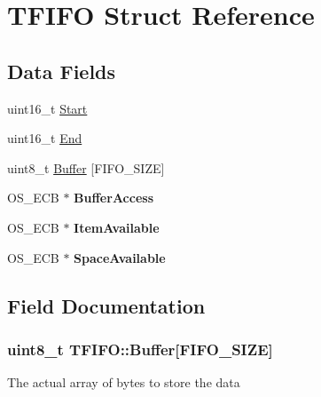 \hypertarget{struct_t_f_i_f_o}{}\section{T\+F\+I\+F\+O Struct Reference}
\label{struct_t_f_i_f_o}
\subsection*{Data Fields}
\begin{DoxyCompactItemize}
\item 
uint16\+\_\+t \hyperlink{struct_t_f_i_f_o_a092a7559431a12616672354641908167}{Start}
\item 
uint16\+\_\+t \hyperlink{struct_t_f_i_f_o_a5063b875898a6f23a97aa3ca17f0544b}{End}
\item 
uint8\+\_\+t \hyperlink{struct_t_f_i_f_o_a5a9d712880dc4f1d5571b96452cd85f8}{Buffer} \mbox{[}F\+I\+F\+O\+\_\+\+S\+I\+Z\+E\mbox{]}
\item 
\hypertarget{struct_t_f_i_f_o_af813d56b46ccae2525c93ef4e3246225}{}O\+S\+\_\+\+E\+C\+B $\ast$ {\bfseries Buffer\+Access}\label{struct_t_f_i_f_o_af813d56b46ccae2525c93ef4e3246225}

\item 
\hypertarget{struct_t_f_i_f_o_a84541650159125cfad1f042cf946cc19}{}O\+S\+\_\+\+E\+C\+B $\ast$ {\bfseries Item\+Available}\label{struct_t_f_i_f_o_a84541650159125cfad1f042cf946cc19}

\item 
\hypertarget{struct_t_f_i_f_o_ad4f8a6e9d0526a76d2b9b6ed319fada9}{}O\+S\+\_\+\+E\+C\+B $\ast$ {\bfseries Space\+Available}\label{struct_t_f_i_f_o_ad4f8a6e9d0526a76d2b9b6ed319fada9}

\end{DoxyCompactItemize}


\subsection{Field Documentation}
\hypertarget{struct_t_f_i_f_o_a5a9d712880dc4f1d5571b96452cd85f8}{}
\subsubsection[{Buffer}]{\setlength{\rightskip}{0pt plus 5cm}uint8\+\_\+t T\+F\+I\+F\+O\+::\+Buffer\mbox{[}F\+I\+F\+O\+\_\+\+S\+I\+Z\+E\mbox{]}}\label{struct_t_f_i_f_o_a5a9d712880dc4f1d5571b96452cd85f8}
The actual array of bytes to store the data \hypertarget{struct_t_f_i_f_o_a5063b875898a6f23a97aa3ca17f0544b}{}
